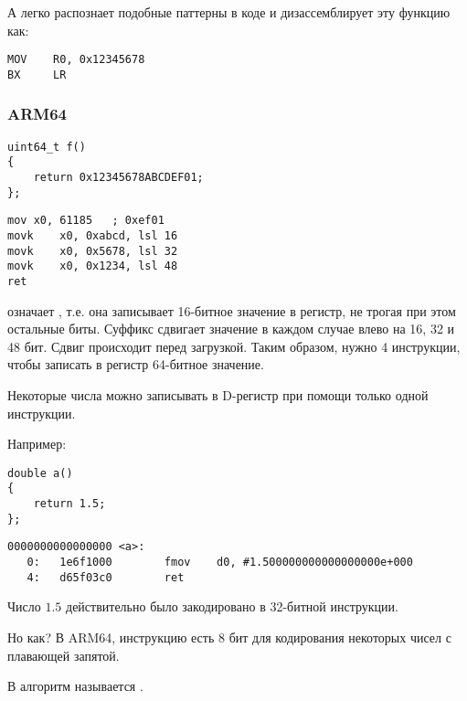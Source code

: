 А \IDA легко распознает подобные паттерны в коде и дизассемблирует эту функцию как:

\begin{lstlisting}[style=customasmARM]
MOV    R0, 0x12345678
BX     LR
\end{lstlisting}

\subsubsection{ARM64}

\begin{lstlisting}[style=customc]
uint64_t f()
{
	return 0x12345678ABCDEF01;
};
\end{lstlisting}

\begin{lstlisting}[caption=GCC 4.9.1 -O3,style=customasmARM]
mov	x0, 61185   ; 0xef01
movk	x0, 0xabcd, lsl 16
movk	x0, 0x5678, lsl 32
movk	x0, 0x1234, lsl 48
ret
\end{lstlisting}

 означает , т.е. она записывает 16-битное значение в регистр, не трогая
при этом остальные биты.
Суффикс  сдвигает значение в каждом случае влево на 16, 32 и 48 бит. Сдвиг происходит
перед загрузкой.
Таким образом, нужно 4 инструкции, чтобы записать в регистр 64-битное значение.


Некоторые числа можно записывать в D-регистр при помощи только одной инструкции.

Например:

\begin{lstlisting}[style=customc]
double a()
{
	return 1.5;
};
\end{lstlisting}

\begin{lstlisting}[caption=GCC 4.9.1 -O3 + objdump,style=customasmARM]
0000000000000000 <a>:
   0:   1e6f1000        fmov    d0, #1.500000000000000000e+000
   4:   d65f03c0        ret
\end{lstlisting}

Число $1.5$ действительно было закодировано в 32-битной инструкции.

Но как?
В ARM64, инструкцию  есть 8 бит для кодирования некоторых чисел с плавающей запятой.

В \ARMSixFourRefURL алгоритм называется .

